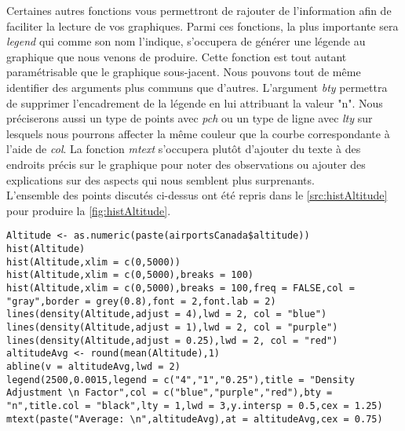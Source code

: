 Certaines autres fonctions vous permettront de rajouter de l'information afin de faciliter la lecture de vos graphiques. Parmi ces fonctions, la plus importante sera \emph{legend} qui comme son nom l'indique, s'occupera de générer une légende au graphique que nous venons de produire. Cette fonction est tout autant paramétrisable que le graphique sous-jacent. Nous pouvons tout de même identifier des arguments plus communs que d'autres. L'argument \emph{bty} permettra de supprimer l'encadrement de la légende en lui attribuant la valeur "n". Nous préciserons aussi un type de points avec \emph{pch} ou un type de ligne avec \emph{lty} sur lesquels nous pourrons affecter la même couleur que la courbe correspondante à l'aide de \emph{col}. La fonction \emph{mtext} s'occupera plutôt d'ajouter du texte à des endroits précis sur le graphique pour noter des observations ou ajouter des explications sur des aspects qui nous semblent plus surprenants. \\

L'ensemble des points discutés ci-dessus ont été repris dans le \autoref{src:histAltitude} pour produire la \autoref{fig:histAltitude}. \\

\begin{lstlisting}[caption = {\emph{hist}, \emph{density}, \emph{lines}, \emph{abline}, \emph{legend} et \emph{mtext}},label=src:histAltitude]
Altitude <- as.numeric(paste(airportsCanada$altitude))
hist(Altitude)
hist(Altitude,xlim = c(0,5000))
hist(Altitude,xlim = c(0,5000),breaks = 100)
hist(Altitude,xlim = c(0,5000),breaks = 100,freq = FALSE,col = "gray",border = grey(0.8),font = 2,font.lab = 2)
lines(density(Altitude,adjust = 4),lwd = 2, col = "blue")
lines(density(Altitude,adjust = 1),lwd = 2, col = "purple")
lines(density(Altitude,adjust = 0.25),lwd = 2, col = "red")
altitudeAvg <- round(mean(Altitude),1)
abline(v = altitudeAvg,lwd = 2)
legend(2500,0.0015,legend = c("4","1","0.25"),title = "Density Adjustment \n Factor",col = c("blue","purple","red"),bty = "n",title.col = "black",lty = 1,lwd = 3,y.intersp = 0.5,cex = 1.25)
mtext(paste("Average: \n",altitudeAvg),at = altitudeAvg,cex = 0.75)
\end{lstlisting}



